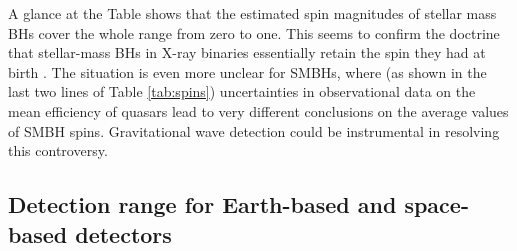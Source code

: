 \documentclass[]{iopart}
\begin{document}
A glance at the Table shows that the estimated spin magnitudes of stellar mass
BHs cover the whole range from zero to one. This seems to confirm the doctrine
that stellar-mass BHs in X-ray binaries essentially retain the spin they had
at birth \cite{King:1999aq}. The situation is even more unclear for SMBHs,
where (as shown in the last two lines of Table \ref{tab:spins}) uncertainties
in observational data on the mean efficiency of quasars lead to very different
conclusions on the average values of SMBH spins. Gravitational wave detection
could be instrumental in resolving this controversy.

\subsection{\label{sec:detectability}Detection range for Earth-based and space-based detectors}
\end{document}
